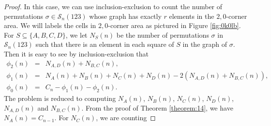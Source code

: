 \documentclass[
final,nomarks
]{dmtcs-episciences}
\newcommand{\tref}[1]{Theorem \ref{theorem:#1}}
\newcommand{\fref}[1]{Figure \ref{fig:#1}}
\newcommand{\Sn}[1]{\mathcal{S}_{#1}}
\begin{document}
\begin{proof}
	In this case, we can  use inclusion-exclusion to count the number of permutations 
	\begin{math}\sigma \in \Sn{n}(123)\end{math} whose graph has exactly \begin{math}r\end{math} elements in the \begin{math}2,0\end{math}-corner area. 
	We will labels the cells in \begin{math}2,0\end{math}-corner area as pictured in \fref{0k0lb}. For 
	\begin{math}S \subseteq  \{A,B,C,D\}\end{math}, we let \begin{math}N_S(n)\end{math} be the number of permutations \begin{math}\sigma\end{math} in \begin{math}\Sn{n}(123)\end{math} such 
	that there is an element in each square of  \begin{math}S\end{math} in the graph of \begin{math}\sigma\end{math}. Then it is easy to see 
	by inclusion-exclusion that 
	\begin{eqnarray}
		\phi_2(n)&=&N_{A,D}(n)+N_{B,C}(n),\\
		\phi_1(n)&=&N_A(n)+N_{B}(n)+N_{C}(n)+N_{D}(n)-2(N_{A,D}(n)+N_{B,C}(n)),\\
		\phi_0(n)&=&C_n-\phi_1(n)-\phi_2(n).
	\end{eqnarray}
	The problem is reduced to computing \begin{math}N_A(n)\end{math}, \begin{math}N_{B}(n)\end{math}, \begin{math}N_{C}(n)\end{math}, \begin{math}N_{D}(n)\end{math}, \begin{math}N_{A,D}(n)\end{math} and \begin{math}N_{B,C}(n)\end{math}. From the proof of \tref{14}, we have \begin{math}N_A(n)=C_{n-1}\end{math}. For \begin{math}N_{C}(n)\end{math}, we are counting 

\end{proof}
\end{document}
